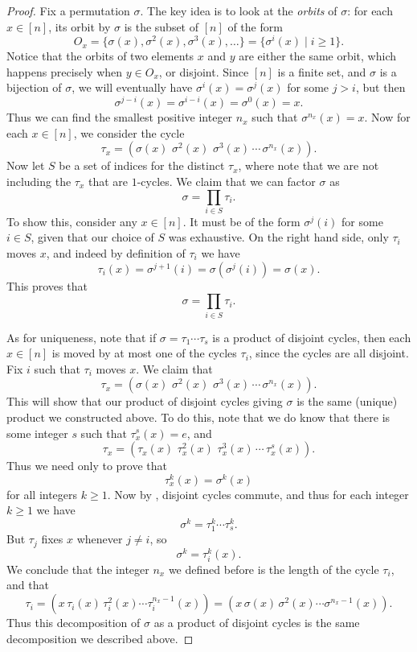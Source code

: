 \documentclass[12pt]{report}
\numberwithin{equation}{section}
\numberwithin{theorem}{chapter}
\theoremstyle{definition}
\newtheorem*{basic properties}{Basic Properties}
\newtheorem*{Important Remark}{Important Remark}
\newcommand{\s}{\sigma}
\begin{document}
\begin{proof}%
Fix a permutation $\sigma$.
The key idea is to look at the \emph{orbits} of $\s$: for each $x \in [n]$, its orbit by $\sigma$ is the subset of $[n]$ of the form 
$$O_x=\{ \sigma(x), \s^2(x), \s^3(x), \ldots \} = \{\s^i(x) \mid i \geqslant 1 \}.$$
Notice that the orbits of two elements $x$ and $y$ are either the same orbit, which happens precisely when $y \in O_x$, or disjoint.
Since $[n]$ is a finite set, and $\sigma$ is a bijection of $\sigma$, we will eventually have $\sigma^i(x) = \sigma^j(x)$ for some $j > i$, but then
$$\sigma^{j-i}(x) = \sigma^{i-i}(x) = \sigma^0(x) = x.$$
Thus we can find the smallest positive integer $n_x$ such that $\s^{n_x}(x)=x$. Now for each $x \in [n]$, we consider the cycle
$$\tau_x = (\sigma(x) \,\, \sigma^2(x) \,\, \sigma^3(x) \, \cdots \, \sigma^{n_x}(x)).$$
Now let $S$ be a set of indices for the distinct $\tau_x$, where note that we are not including the $\tau_x$ that are $1$-cycles. We claim that we can factor $\s$ as
$$\s=\prod_{i\in S}\tau_i.$$
To show this, consider any $x \in [n]$. It must be of the form $\sigma^j(i)$ for some $i \in S$, given that our choice of $S$ was exhaustive. On the right hand side, only $\tau_i$ moves $x$, and indeed by definition of $\tau_i$ we have
$$\tau_i(x) = \sigma^{j+1}(i) = \sigma(\sigma^j(i)) = \sigma(x).$$
This proves that
$$\s=\prod_{i\in S}\tau_i.$$

As for uniqueness, note that if $\s = \tau_1 \cdots \tau_s$ is a product of disjoint cycles, then each $x \in [n]$ is moved by at most one of the cycles $\tau_i$, since the cycles are all disjoint. Fix $i$ such that $\tau_i$ moves $x$. We claim that
$$\tau_x = (\sigma(x) \,\, \sigma^2(x) \,\,\sigma^3(x) \, \cdots \, \sigma^{n_x}(x)).$$
This will show that our product of disjoint cycles giving $\s$ is the same (unique) product we constructed above. To do this, note that we do know that there is some integer $s$ such that $\tau_x^s(x) = e$, and
$$\tau_x = (\tau_x(x) \,\, \tau_x^2(x) \,\, \tau_x^3(x) \, \cdots \, \tau_x^{s}(x)).$$
Thus we need only to prove that
$$\tau_x^k(x) = \sigma^k(x)$$
for all integers $k \geqslant 1$. Now by , disjoint cycles commute, and thus for each integer $k \geqslant 1$ we have
$$\sigma^k = \tau_1^k \cdots \tau_s^k.$$
But $\tau_j$ fixes $x$ whenever $j \neq i$, so
$$\sigma^k = \tau_i^k (x).$$
We conclude that the integer $n_x$ we defined before is the length of the cycle $\tau_i$, and that
$$\tau_i = (x \, \tau_i(x) \, \tau_i^2(x) \cdots \tau_i^{n_x-1}(x)) = (x \, \sigma(x) \, \sigma^2(x) \cdots \sigma^{n_x-1}(x)).$$
Thus this decomposition of $\sigma$ as a product of disjoint cycles is the same decomposition we described above.
\end{proof}
\end{document}
